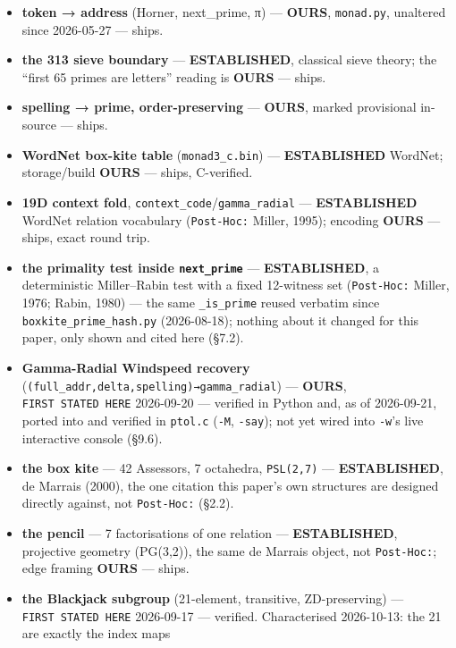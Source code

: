 \documentclass[
  10pt,
]{article}
\providecommand{\tightlist}{%
  \setlength{\itemsep}{0pt}\setlength{\parskip}{0pt}}
\begin{document}
\begin{itemize}
\tightlist
\item
  \textbf{token → address} (Horner, next\_prime, π) --- \textbf{OURS},
  \texttt{monad.py}, unaltered since 2026-05-27 --- ships.
\item
  \textbf{the 313 sieve boundary} --- \textbf{ESTABLISHED}, classical
  sieve theory; the ``first 65 primes are letters'' reading is
  \textbf{OURS} --- ships.
\item
  \textbf{spelling → prime, order-preserving} --- \textbf{OURS}, marked
  provisional in-source --- ships.
\item
  \textbf{WordNet box-kite table} (\texttt{monad3\_c.bin}) ---
  \textbf{ESTABLISHED} WordNet; storage/build \textbf{OURS} --- ships,
  C-verified.
\item
  \textbf{19D context fold},
  \texttt{context\_code}/\texttt{gamma\_radial} --- \textbf{ESTABLISHED}
  WordNet relation vocabulary (\texttt{Post-Hoc:} Miller, 1995);
  encoding \textbf{OURS} --- ships, exact round trip.
\item
  \textbf{the primality test inside \texttt{next\_prime}} ---
  \textbf{ESTABLISHED}, a deterministic Miller--Rabin test with a fixed
  12-witness set (\texttt{Post-Hoc:} Miller, 1976; Rabin, 1980) --- the
  same \texttt{\_is\_prime} reused verbatim since
  \texttt{boxkite\_prime\_hash.py} (2026-08-18); nothing about it
  changed for this paper, only shown and cited here (§7.2).
\item
  \textbf{Gamma-Radial Windspeed recovery}
  (\texttt{(full\_addr,delta,spelling)→gamma\_radial}) ---
  \textbf{OURS}, \texttt{FIRST\ STATED\ HERE} 2026-09-20 --- verified in
  Python and, as of 2026-09-21, ported into and verified in
  \texttt{ptol.c} (\texttt{-M}, \texttt{-say}); not yet wired into
  \texttt{-w}'s live interactive console (§9.6).
\item
  \textbf{the box kite} --- 42 Assessors, 7 octahedra, \texttt{PSL(2,7)}
  --- \textbf{ESTABLISHED}, de Marrais (2000), the one citation this
  paper's own structures are designed directly against, not
  \texttt{Post-Hoc:} (§2.2).
\item
  \textbf{the pencil} --- 7 factorisations of one relation ---
  \textbf{ESTABLISHED}, projective geometry (PG(3,2)), the same de
  Marrais object, not \texttt{Post-Hoc:}; edge framing \textbf{OURS} ---
  ships.
\item
  \textbf{the Blackjack subgroup} (21-element, transitive,
  ZD-preserving) --- \texttt{FIRST\ STATED\ HERE} 2026-09-17 ---
  verified. Characterised 2026-10-13: the 21 are exactly the index maps

\end{itemize}
\end{document}
